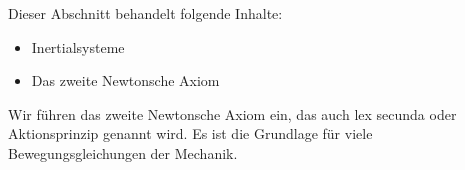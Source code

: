                               
                
               
               
               \begin{MIntro}
               
               Dieser Abschnitt behandelt folgende Inhalte:
               \begin{itemize}
               \item{Inertialsysteme}
               \item{Das zweite Newtonsche Axiom}
               \end{itemize}
               
               
               \end{MIntro}
               Wir f\"uhren das zweite Newtonsche Axiom ein, das auch lex secunda oder Aktionsprinzip genannt wird. Es ist die Grundlage f\"ur viele Bewegungsgleichungen der Mechanik.
